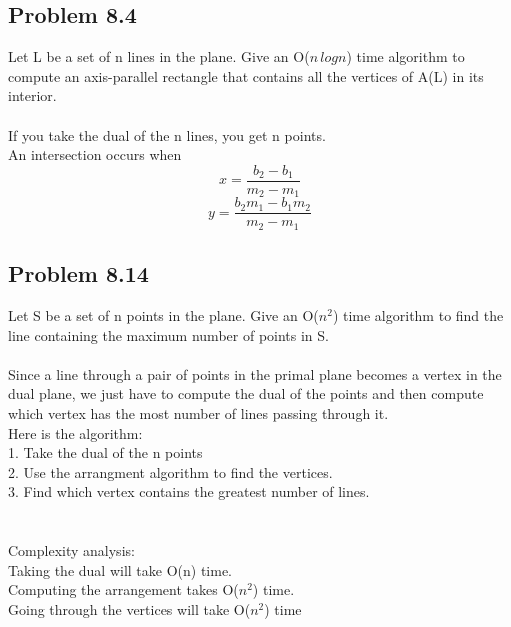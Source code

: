 \documentclass[11pt,psfig]{article}
\begin{document}
\subsection*{Problem 8.4}

Let L be a set of n lines in the plane. Give an O($n \, logn$) time algorithm to
compute an axis-parallel rectangle that contains all the vertices of A(L)
in its interior.
\\
\\
If you take the dual of the n lines, you get n points. \\
An intersection occurs when 
\[
x = \frac{b_2-b_1}{m_2-m_1}
\]
\[
y = \frac{b_2m_1 - b_1m_2}{m_2-m_1}
\]


\subsection*{Problem 8.14}

Let S be a set of n points in the plane. Give an O($n^2$) time algorithm to
find the line containing the maximum number of points in S.
\\
\\
Since a line through a pair of points in the primal plane becomes a vertex in the dual plane, we just have to compute the dual of the points and then compute which vertex has the most number of lines passing through it. 
\\
Here is the algorithm:\\
1. Take the dual of the n points\\
2. Use the arrangment algorithm to find the vertices. \\
3. Find which vertex contains the greatest number of lines. \\
\\
\\
Complexity analysis:\\
Taking the dual will take O(n) time. \\
Computing the arrangement takes O($n^2$) time. \\
Going through the vertices will take O($n^2$) time


\end{document}
